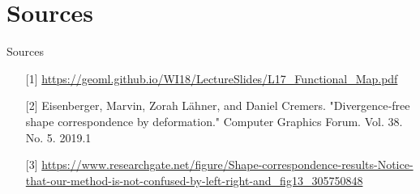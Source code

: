 \documentclass[xcolor=dvipsnames]{beamer}
\begin{document}
\section{Sources}
\begin{frame}{Sources}
\begin{enumerate}
\item[][1] \url{https://geoml.github.io/WI18/LectureSlides/L17_Functional_Map.pdf}
\item[][2] Eisenberger, Marvin, Zorah Lähner, and Daniel Cremers. "Divergence‐free shape correspondence by deformation." Computer Graphics Forum. Vol. 38. No. 5. 2019.1
\item[][3] \url{https://www.researchgate.net/figure/Shape-correspondence-results-Notice-that-our-method-is-not-confused-by-left-right-and_fig13_305750848}
\end{enumerate}
\end{frame}

\end{document}
